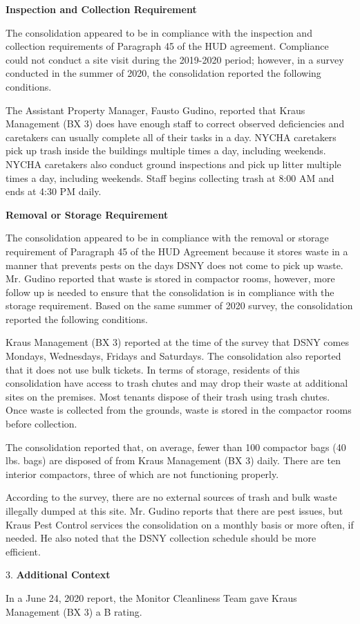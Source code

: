 

\textbf{Inspection and Collection Requirement}

The consolidation appeared to be in compliance with the inspection and collection requirements of Paragraph 45 of the HUD agreement. Compliance could not conduct a site visit during the 2019-2020 period; however, in a survey conducted in the summer of 2020, the consolidation reported the following conditions.

The Assistant Property Manager, Fausto Gudino, reported that Kraus Management (BX 3) does have enough staff to correct observed deficiencies and caretakers can usually complete all of their tasks in a day. NYCHA caretakers pick up trash inside the buildings multiple times a day, including weekends. NYCHA caretakers also conduct ground inspections and pick up litter multiple times a day, including weekends. Staff begins collecting trash at 8:00 AM and ends at 4:30 PM daily. 

\textbf{Removal or Storage Requirement}

The consolidation appeared to be in compliance with the  removal or storage requirement of Paragraph  45 of the HUD Agreement because it stores waste in a manner that prevents pests on the days DSNY does not come to pick up waste. Mr. Gudino reported that waste is stored in compactor rooms, however, more follow up is needed to ensure that the consolidation is in compliance with the storage requirement. Based on the same summer of  2020 survey, the consolidation reported the following conditions.

Kraus Management (BX 3) reported at the time of the survey that DSNY comes Mondays, Wednesdays, Fridays and Saturdays. The consolidation also reported that it does not use bulk tickets. In terms of storage, residents of this consolidation have access to trash chutes and may drop their waste at additional sites on the premises. Most tenants dispose of their trash using trash chutes. Once waste is collected from the grounds, waste is stored in the compactor rooms before collection. 

The consolidation reported that, on average, fewer than 100 compactor bags (40 lbs. bags) are disposed of from Kraus Management (BX 3) daily. There are ten interior compactors, three of which are not functioning properly. 

According to the survey, there are no external sources of trash and bulk waste illegally dumped at this site. Mr. Gudino reports that there are pest issues, but Kraus Pest Control services the consolidation on a monthly basis or more often, if needed. He also noted that the DSNY collection schedule should be more efficient. 

3. \textbf{Additional Context} 

In a June 24, 2020 report, the Monitor Cleanliness Team gave Kraus Management (BX 3) a B rating. 